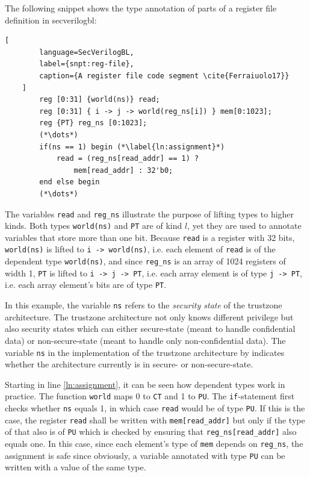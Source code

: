 \begin{example}
    The following snippet shows the type annotation of parts of a register file definition in \gls{secverilogbl}:
    \begin{lstlisting}[
        language=SecVerilogBL,
        label={snpt:reg-file},
        caption={A register file code segment \cite{Ferraiuolo17}}
    ]
        reg [0:31] {world(ns)} read;
        reg [0:31] { i -> j -> world(reg_ns[i]) } mem[0:1023];
        reg {PT} reg_ns [0:1023];
        (*\dots*)
        if(ns == 1) begin (*\label{ln:assignment}*)
            read = (reg_ns[read_addr] == 1) ?
                mem[read_addr] : 32'b0;
        end else begin
        (*\dots*)
    \end{lstlisting}

    The variables \lstinline{read} and \lstinline{reg_ns} illustrate the purpose of lifting types to higher kinds.
    Both types \lstinline{world(ns)} and \lstinline{PT} are of kind $ l $, yet they are used to annotate variables that store more than one bit.
    Because \lstinline{read} is a register with 32 bits, \lstinline{world(ns)} is lifted to \lstinline{i -> world(ns)}, i.e. each element of \lstinline{read} is of the dependent type \lstinline{world(ns)}, and since \lstinline{reg_ns} is an array of 1024 registers of width 1, \lstinline{PT} is lifted to \lstinline{i -> j -> PT}, i.e. each array element is of type \lstinline{j -> PT}, i.e. each array element's bits are of type \lstinline{PT}.

    In this example, the variable \lstinline{ns} refers to the \textit{security state} of the \gls{trustzone} architecture.
    The \gls{trustzone} architecture not only knows different privilege but also security states which can either secure-state (meant to handle confidential data) or non-secure-state (meant to handle only non-confidential data).
    The variable \lstinline{ns} in the implementation of the \gls{trustzone} architecture by \citeauthor{Ferraiuolo17} indicates whether the architecture currently is in secure- or non-secure-state.

    Starting in line \ref{ln:assignment}, it can be seen how dependent types work in practice.
    The function \lstinline{world} maps 0 to \lstinline{CT} and 1 to \lstinline{PU}.
    The \lstinline{if}-statement first checks whether \lstinline{ns} equals 1, in which case \lstinline{read} would be of type \lstinline{PU}.
    If this is the case, the register \lstinline{read} shall be written with \lstinline{mem[read_addr]} but only if the type of that also is of \lstinline{PU} which is checked by ensuring that \lstinline{reg_ns[read_addr]} also equals one.
    In this case, since each element's type of \lstinline{mem} depends on \lstinline{reg_ns}, the assignment is safe since obviously, a variable annotated with type \lstinline{PU} can be written with a value of the same type.


\end{example}
